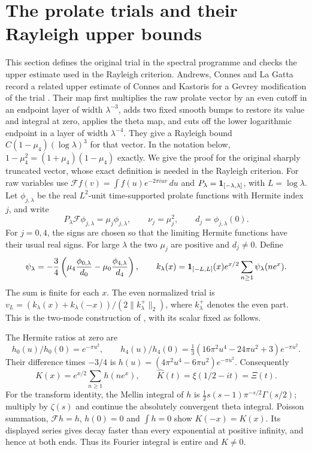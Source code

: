 \section{The prolate trials and their Rayleigh upper bounds}
\label{sec:prolate-trial}
This section defines the original trial in the spectral programme and
checks the upper estimate used in the Rayleigh criterion.
Andrews, Connes and La Gatta record a related upper estimate of Connes
and Kastoris for a Gevrey modification of the trial
\cite[Theorem~3.1, p.~14]{andrews-connes-lagatta2026}.
Their map first multiplies the raw prolate vector by an even cutoff in
an endpoint layer of width $\lambda^{-3}$, adds two fixed smooth bumps
to restore its value and integral at zero, applies the theta map, and
cuts off the lower logarithmic endpoint in a layer of width
$\lambda^{-4}$. They give a Rayleigh bound
$C(1-\mu_4)(\log\lambda)^3$ for that vector. In the notation below,
$1-\mu_4^2=(1+\mu_4)(1-\mu_4)$ exactly. We give the proof for the
original sharply truncated vector, whose exact definition is needed
in the Rayleigh criterion.
For raw variables use
$\mathcal Ff(v)=\int f(u)e^{-2\pi iuv}\,du$ and
$P_\lambda={\bf1}_{[-\lambda,\lambda]}$, with $L=\log\lambda$.
Let $\phi_{j,\lambda}$ be the real $L^2$-unit time-supported prolate
functions with Hermite index $j$, and write
\[
 P_\lambda\mathcal F\phi_{j,\lambda}
       =\mu_j\phi_{j,\lambda},\qquad
 \nu_j=\mu_j^2,\qquad d_j=\phi_{j,\lambda}(0).
\]
For $j=0,4$, the signs are chosen so that the limiting Hermite
functions have their usual real signs. For large $\lambda$ the two
$\mu_j$ are positive and $d_j\ne0$. Define
\[
 \psi_\lambda=-\frac34\left(
       \mu_4\frac{\phi_{0,\lambda}}{d_0}
       -\mu_0\frac{\phi_{4,\lambda}}{d_4}\right),\qquad
 k_\lambda(x)={\bf1}_{[-L,L]}(x)e^{x/2}
                  \sum_{n\ge1}\psi_\lambda(ne^x).
\]
The sum is finite for each $x$. The even normalized trial is
$v_L=(k_\lambda(x)+k_\lambda(-x))/(2\|k_\lambda^+\|_2)$,
where $k_\lambda^+$ denotes the even part.
This is the two-mode construction of
\cite[\S7, pp.~28--31]{ccm2025}, with its scalar fixed as follows.

The Hermite ratios at zero are
\[
 h_0(u)/h_0(0)=e^{-\pi u^2},\qquad
 h_4(u)/h_4(0)=
 \tfrac13(16\pi^2u^4-24\pi u^2+3)e^{-\pi u^2}.
\]
Their difference times $-3/4$ is
$h(u)=(4\pi^2u^4-6\pi u^2)e^{-\pi u^2}$.
Consequently
\[
 K(x)=e^{x/2}\sum_{n\ge1}h(ne^x),\qquad
 \widehat K(t)=\xi(1/2-it)=\Xi(t).
\]
For the transform identity, the Mellin integral of $h$ is
$\tfrac12s(s-1)\pi^{-s/2}\Gamma(s/2)$; multiply by $\zeta(s)$
and continue the absolutely convergent theta integral.
Poisson summation, $\mathcal Fh=h$, $h(0)=0$ and $\int h=0$ show
$K(-x)=K(x)$. Its displayed series gives decay faster than every
exponential at positive infinity, and hence at both ends.
Thus its Fourier integral is entire and $K\ne0$.

